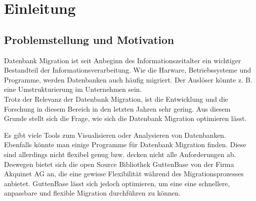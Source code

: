 \chapter{Einleitung}

\section{Problemstellung und Motivation}


Datenbank Migration ist seit Anbeginn des Informationszeitalter ein wichtiger Bestandteil der Informationsverarbeitung. Wie die Harware, Betriebssysteme und Programme, werden Datenbanken auch häufig migriert. Der Auslöser könnte z. B. eine Umstrukturierung im Unternehmen sein. \\
Trotz der Relevanz der Datenbank Migration, ist die Entwicklung und die Forschung in diesem Bereich in den letzten Jahren sehr gering. Aus diesem Grunde stellt sich die Frage, wie sich die Datenbank Migration optimieren lässt.

Es gibt viele Tools zum Visualisieren oder Analysieren von  Datenbanken. Ebenfalls könnte man einige Programme für Datenbank Migration finden. Diese sind allerdings nicht flexibel genug bzw. decken nicht alle Anforderungen ab. Deswegen bietet sich die open Source Bibliothek GuttenBase von der Firma Akquinet AG an, die eine gewisse Flexibilität während des Migrationsprozesses anbietet. GuttenBase lässt sich jedoch optimieren, um eine eine schnellere, anpassbare und flexible Migration durchführen zu können. 

